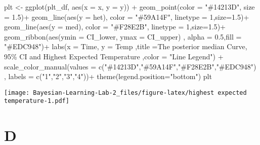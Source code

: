 \documentclass[
]{article}
\newenvironment{Shaded}{\begin{snugshade}}{\end{snugshade}}
\newcommand{\AttributeTok}[1]{\textcolor[rgb]{0.77,0.63,0.00}{#1}}
\newcommand{\DecValTok}[1]{\textcolor[rgb]{0.00,0.00,0.81}{#1}}
\newcommand{\FloatTok}[1]{\textcolor[rgb]{0.00,0.00,0.81}{#1}}
\newcommand{\FunctionTok}[1]{\textcolor[rgb]{0.00,0.00,0.00}{#1}}
\newcommand{\NormalTok}[1]{#1}
\newcommand{\OtherTok}[1]{\textcolor[rgb]{0.56,0.35,0.01}{#1}}
\newcommand{\SpecialCharTok}[1]{\textcolor[rgb]{0.00,0.00,0.00}{#1}}
\newcommand{\StringTok}[1]{\textcolor[rgb]{0.31,0.60,0.02}{#1}}
\begin{document}
\begin{Shaded}
\begin{Highlighting}[]
\NormalTok{plt }\OtherTok{\textless{}{-}} \FunctionTok{ggplot}\NormalTok{(plt\_df, }\FunctionTok{aes}\NormalTok{(}\AttributeTok{x =}\NormalTok{ x, }\AttributeTok{y =}\NormalTok{ y)) }\SpecialCharTok{+}
  \FunctionTok{geom\_point}\NormalTok{(}\AttributeTok{color =} \StringTok{"\#14213D"}\NormalTok{, }\AttributeTok{size =} \FloatTok{1.5}\NormalTok{)}\SpecialCharTok{+}
  \FunctionTok{geom\_line}\NormalTok{(}\FunctionTok{aes}\NormalTok{(}\AttributeTok{y =}\NormalTok{ het), }\AttributeTok{color =} \StringTok{"\#59A14F"}\NormalTok{, }\AttributeTok{linetype =} \DecValTok{1}\NormalTok{,}\AttributeTok{size=}\FloatTok{1.5}\NormalTok{)}\SpecialCharTok{+}
  \FunctionTok{geom\_line}\NormalTok{(}\FunctionTok{aes}\NormalTok{(}\AttributeTok{y =}\NormalTok{ med), }\AttributeTok{color =} \StringTok{"\#F28E2B"}\NormalTok{, }\AttributeTok{linetype =} \DecValTok{1}\NormalTok{,}\AttributeTok{size=}\FloatTok{1.5}\NormalTok{)}\SpecialCharTok{+}
  \FunctionTok{geom\_ribbon}\NormalTok{(}\FunctionTok{aes}\NormalTok{(}\AttributeTok{ymin =}\NormalTok{ CI\_lower, }\AttributeTok{ymax =}\NormalTok{ CI\_upper)}
\NormalTok{              , }\AttributeTok{alpha =} \FloatTok{0.5}\NormalTok{,}\AttributeTok{fill =} \StringTok{"\#EDC948"}\NormalTok{)}\SpecialCharTok{+}
  \FunctionTok{labs}\NormalTok{(}\AttributeTok{x =} \StringTok{\textquotesingle{}Time\textquotesingle{}}\NormalTok{, }\AttributeTok{y =} \StringTok{\textquotesingle{}Temp\textquotesingle{}}
\NormalTok{       ,}\AttributeTok{title =}\StringTok{\textquotesingle{}The posterior median Curve, }
\StringTok{       95\% CI and Highest Expected Temperature\textquotesingle{}}
\NormalTok{       ,}\AttributeTok{color =} \StringTok{"Line Legend"}\NormalTok{) }\SpecialCharTok{+}
  \FunctionTok{scale\_color\_manual}\NormalTok{(}\AttributeTok{values =} \FunctionTok{c}\NormalTok{(}\StringTok{"\#14213D"}\NormalTok{,}\StringTok{"\#59A14F"}\NormalTok{,}\StringTok{"\#F28E2B"}\NormalTok{,}\StringTok{"\#EDC948"}\NormalTok{)}
\NormalTok{                     , }\AttributeTok{labels =} \FunctionTok{c}\NormalTok{(}\StringTok{"1"}\NormalTok{,}\StringTok{"2"}\NormalTok{,}\StringTok{"3"}\NormalTok{,}\StringTok{"4"}\NormalTok{))}\SpecialCharTok{+}
  \FunctionTok{theme}\NormalTok{(}\AttributeTok{legend.position=}\StringTok{"bottom"}\NormalTok{)}
\NormalTok{plt}
\end{Highlighting}
\end{Shaded}

\texttt{[image: Bayesian-Learning-Lab-2\_files/figure-latex/highest expected temperature-1.pdf]}

\hypertarget{d}{%
\section{D}\label{d}}
\end{document}
